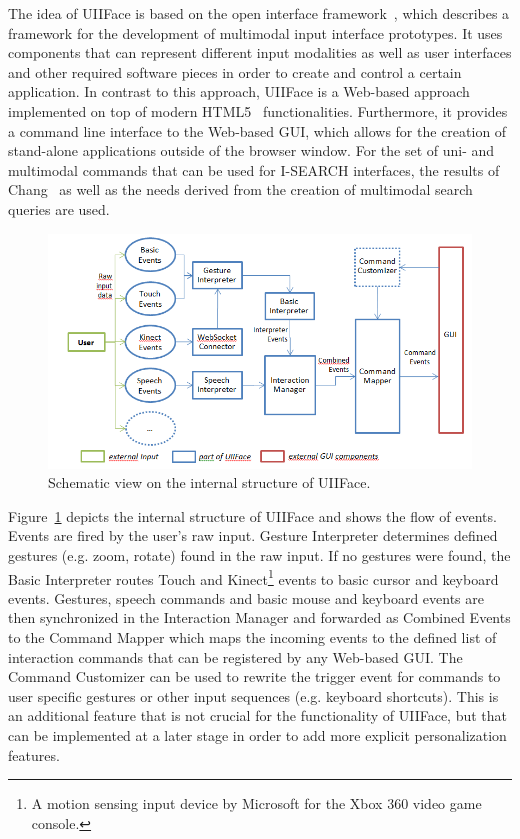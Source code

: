 \documentclass[runningheads,a4paper]{llncs} \usepackage[utf8]{inputenc}
\begin{document}
The idea of UIIFace is based on the open interface framework~\cite{openinterface}, which describes a framework for the development of multimodal input interface prototypes. It uses components that can represent different input modalities as well as user interfaces and other required software pieces in order to create and control a certain application. In contrast to this approach, UIIFace is a Web-based approach implemented on top of modern HTML5~\cite{html5} functionalities. Furthermore, it provides a command line interface to the Web-based GUI, which allows for the creation of stand-alone applications outside of the browser window. For the set of uni- and multimodal commands that can be used for \mbox{I-SEARCH} interfaces, the results of Chang~\cite{chang} as well as the needs derived from the creation of multimodal search queries are used.

\begin{figure}[h!]
  \centering
    \includegraphics[width=0.8\linewidth]{resources/uiiface-structure.png}
  \caption{Schematic view on the internal structure of UIIFace.}
  \label{fig:uiiface}
\end{figure}

Figure~\ref{fig:uiiface} depicts the internal structure of UIIFace and shows the flow of events. Events are fired by the user's raw input. Gesture Interpreter determines defined gestures (e.g. zoom, rotate) found in the raw input. If no
gestures were found, the Basic Interpreter routes Touch and Kinect\footnote{A motion sensing input device by Microsoft for the Xbox 360 video game console.} events to basic cursor and keyboard events. Gestures, speech commands and basic mouse and keyboard events are then synchronized in the Interaction Manager and forwarded as Combined Events to the Command Mapper which maps the incoming events to the defined list of interaction commands that can be registered by any Web-based GUI. The Command Customizer can be used to rewrite the trigger event for commands to user specific gestures or other input sequences (e.g. keyboard shortcuts). This is an additional feature that is not crucial for the functionality of UIIFace, but that can be implemented at a later stage in order to add more explicit personalization features.
\end{document}

